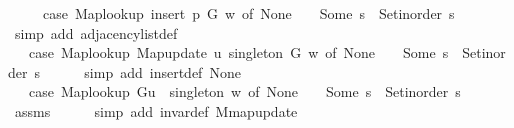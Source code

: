 \begin{isabellebody}
\ \ \ \ \ {\isacharparenleft}{\kern0pt}case\ Map{\isacharunderscore}{\kern0pt}lookup\ {\isacharparenleft}{\kern0pt}insert\ p\ G{\isacharparenright}{\kern0pt}\ w\ of\ None\ {\isasymRightarrow}\ {\isacharbrackleft}{\kern0pt}{\isacharbrackright}{\kern0pt}\ {\isacharbar}{\kern0pt}\ Some\ s\ {\isasymRightarrow}\ Set{\isacharunderscore}{\kern0pt}inorder\ s{\isacharparenright}{\kern0pt}{\isachardoublequoteclose}\isanewline
\ \ \ \ \isamarkupfalse%
\ {\isacharparenleft}{\kern0pt}simp\ add{\isacharcolon}{\kern0pt}\ adjacency{\isacharunderscore}{\kern0pt}list{\isacharunderscore}{\kern0pt}def{\isacharparenright}{\kern0pt}\isanewline
\ \ \isamarkupfalse%
\ \isamarkupfalse%
\ {\isachardoublequoteopen}{\isachardot}{\kern0pt}{\isachardot}{\kern0pt}{\isachardot}{\kern0pt}\ {\isacharequal}{\kern0pt}\ {\isacharparenleft}{\kern0pt}case\ Map{\isacharunderscore}{\kern0pt}lookup\ {\isacharparenleft}{\kern0pt}Map{\isacharunderscore}{\kern0pt}update\ {\isacharquery}{\kern0pt}u\ {\isacharquery}{\kern0pt}singleton\ G{\isacharparenright}{\kern0pt}\ w\ of\ None\ {\isasymRightarrow}\ {\isacharbrackleft}{\kern0pt}{\isacharbrackright}{\kern0pt}\ {\isacharbar}{\kern0pt}\ Some\ s\ {\isasymRightarrow}\ Set{\isacharunderscore}{\kern0pt}inorder\ s{\isacharparenright}{\kern0pt}{\isachardoublequoteclose}\isanewline
\ \ \ \ \isamarkupfalse%
\ {\isacharparenleft}{\kern0pt}simp\ add{\isacharcolon}{\kern0pt}\ insert{\isacharunderscore}{\kern0pt}def\ None{\isacharparenright}{\kern0pt}\isanewline
\ \ \isamarkupfalse%
\ \isamarkupfalse%
\ {\isachardoublequoteopen}{\isachardot}{\kern0pt}{\isachardot}{\kern0pt}{\isachardot}{\kern0pt}\ {\isacharequal}{\kern0pt}\ {\isacharparenleft}{\kern0pt}case\ {\isacharparenleft}{\kern0pt}Map{\isacharunderscore}{\kern0pt}lookup\ G{\isacharparenleft}{\kern0pt}{\isacharquery}{\kern0pt}u\ {\isasymmapsto}\ {\isacharquery}{\kern0pt}singleton{\isacharparenright}{\kern0pt}{\isacharparenright}{\kern0pt}\ w\ of\ None\ {\isasymRightarrow}\ {\isacharbrackleft}{\kern0pt}{\isacharbrackright}{\kern0pt}\ {\isacharbar}{\kern0pt}\ Some\ s\ {\isasymRightarrow}\ Set{\isacharunderscore}{\kern0pt}inorder\ s{\isacharparenright}{\kern0pt}{\isachardoublequoteclose}\isanewline
\ \ \ \ \isamarkupfalse%
\ assms\isanewline
\ \ \ \ \isamarkupfalse%
\ {\isacharparenleft}{\kern0pt}simp\ add{\isacharcolon}{\kern0pt}\ invar{\isacharunderscore}{\kern0pt}def\ M{\isachardot}{\kern0pt}map{\isacharunderscore}{\kern0pt}update{\isacharparenright}{\kern0pt}\isanewline
\ \ \isamarkupfalse%

\end{isabellebody}
